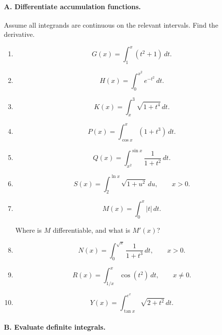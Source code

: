 \paragraph{A. Differentiate accumulation functions.}

Assume all integrands are continuous on the relevant intervals.  Find the derivative.

\begin{enumerate}
\item

\[
G(x)=\int_1^x (t^2+1)\,dt.
\]

\item

\[
H(x)=\int_0^{x^2} e^{-t^2}\,dt.
\]

\item

\[
K(x)=\int_x^3 \sqrt{1+t^4}\,dt.
\]

\item

\[
P(x)=\int_{\cos x}^{x} (1+t^3)\,dt.
\]

\item

\[
Q(x)=\int_{x^2}^{\sin x} \frac{1}{1+t^2}\,dt.
\]

\item

\[
S(x)=\int_2^{\ln x} \sqrt{1+u^2}\,du,
\qquad x>0.
\]

\item

\[
M(x)=\int_0^x |t|\,dt.
\]

Where is \(M\) differentiable, and what is \(M'(x)\)?

\item

\[
N(x)=\int_0^{\sqrt{x}} \frac{1}{1+t^3}\,dt,
\qquad x>0.
\]

\item

\[
R(x)=\int_{1/x}^{x} \cos(t^2)\,dt,
\qquad x\neq0.
\]

\item

\[
Y(x)=\int_{\tan x}^{e^x} \sqrt{2+t^2}\,dt.
\]

\end{enumerate}

\paragraph{B. Evaluate definite integrals.}

